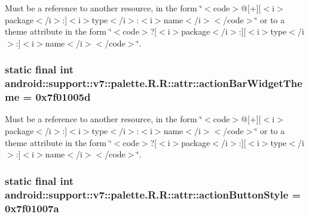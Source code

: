 Must be a reference to another resource, in the form \char`\"{}$<$code$>$@\mbox{[}+\mbox{]}\mbox{[}$<$i$>$package$<$/i$>$:\mbox{]}$<$i$>$type$<$/i$>$:$<$i$>$name$<$/i$>$$<$/code$>$\char`\"{} or to a theme attribute in the form \char`\"{}$<$code$>$?\mbox{[}$<$i$>$package$<$/i$>$:\mbox{]}\mbox{[}$<$i$>$type$<$/i$>$:\mbox{]}$<$i$>$name$<$/i$>$$<$/code$>$\char`\"{}. \hypertarget{classandroid_1_1support_1_1v7_1_1palette_1_1_r_1_1attr_7ce03663fa2e6e32ff7cd516b003235c}{
\subsubsection[{actionBarWidgetTheme}]{\setlength{\rightskip}{0pt plus 5cm}static final int android::support::v7::palette.R.R::attr::actionBarWidgetTheme = 0x7f01005d}}
\label{classandroid_1_1support_1_1v7_1_1palette_1_1_r_1_1attr_7ce03663fa2e6e32ff7cd516b003235c}


Must be a reference to another resource, in the form \char`\"{}$<$code$>$@\mbox{[}+\mbox{]}\mbox{[}$<$i$>$package$<$/i$>$:\mbox{]}$<$i$>$type$<$/i$>$:$<$i$>$name$<$/i$>$$<$/code$>$\char`\"{} or to a theme attribute in the form \char`\"{}$<$code$>$?\mbox{[}$<$i$>$package$<$/i$>$:\mbox{]}\mbox{[}$<$i$>$type$<$/i$>$:\mbox{]}$<$i$>$name$<$/i$>$$<$/code$>$\char`\"{}. \hypertarget{classandroid_1_1support_1_1v7_1_1palette_1_1_r_1_1attr_01d6bb9eb2b0d16b8e9b0bc8e9fca138}{
\subsubsection[{actionButtonStyle}]{\setlength{\rightskip}{0pt plus 5cm}static final int android::support::v7::palette.R.R::attr::actionButtonStyle = 0x7f01007a}}
\label{classandroid_1_1support_1_1v7_1_1palette_1_1_r_1_1attr_01d6bb9eb2b0d16b8e9b0bc8e9fca138}


